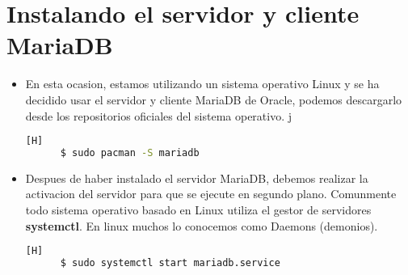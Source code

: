 \newpage %
\section{Instalando el servidor y cliente MariaDB}
\begin{itemize}
  \item En esta ocasion, estamos utilizando un sistema operativo Linux y se ha decidido usar el servidor y cliente MariaDB de Oracle, podemos descargarlo desde los repositorios oficiales del sistema operativo.  
    j
  \begin{lstlisting}[language=bash,caption={Descargando el servidor y el cliente MariaDB}][H]
	  $ sudo pacman -S mariadb
  \end{lstlisting}
\end{itemize}

\begin{itemize}
  \item Despues de haber instalado el servidor MariaDB, debemos realizar la activacion del servidor para que se ejecute en segundo plano. Comunmente todo sistema operativo basado en Linux utiliza el gestor de servidores \textbf{systemctl}. En linux muchos lo conocemos como Daemons (demonios).
  \begin{lstlisting}[language=bash,caption={Descargando el servidor y el cliente MariaDB}][H]
	  $ sudo systemctl start mariadb.service
  \end{lstlisting}
\end{itemize}


